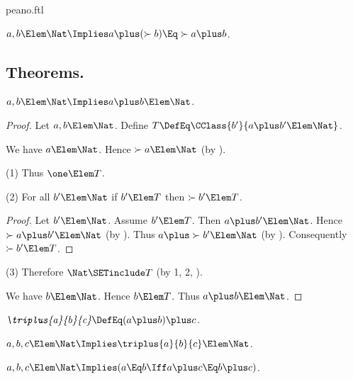 \documentclass{stex}
\begin{document}
\begin{smodule}{peano.ftl}
\begin{forthel}
  \begin{axiom*}[title=18,name=P18]
    $a,b \Elem \Nat \Implies a \plus (\succ{b}) \Eq \succ{a \plus b}$.
  \end{axiom*}
\end{forthel}


\subsection{Theorems.}


\begin{forthel}
  \begin{theorem*}[title=19,name=P19]
    $a,b \Elem \Nat \Implies a \plus b \Elem \Nat$.
  \end{theorem*}
  \begin{proof}
    Let $a,b \Elem \Nat$.
    Define $T \DefEq \CClass{b'}{a \plus b' \Elem \Nat}$.
    
    We have $a \Elem \Nat$.
    Hence $\succ{a} \Elem \Nat$ (by ).
    
    (1) Thus $\one \Elem T$.

    (2) For all $b' \Elem \Nat$ if $b' \Elem T$ then $\succ{b'} \Elem T$.
    \begin{proof}
      Let $b' \Elem \Nat$.
      Assume $b' \Elem T$.
      Then $a \plus b' \Elem \Nat$.
      Hence $\succ{a \plus b'} \Elem \Nat$ (by ).
      Thus $a \plus \succ{b'} \Elem \Nat$ (by ).
      Consequently $\succ{b'} \Elem T$.
    \end{proof}

    (3) Therefore $\Nat \SETinclude T$ (by 1, 2, ).

    We have $b \Elem \Nat$.
    Hence $b \Elem T$.
    Thus $a \plus b \Elem \Nat$.
  \end{proof}

  \begin{definition*}[title=20,for=triplus]
    $\emph{\triplus{a}{b}{c}} \DefEq (a \plus b) \plus c$.
  \end{definition*}

  \begin{theorem*}[title=21,name=P21]
    $a,b,c \Elem \Nat \Implies \triplus{a}{b}{c} \Elem \Nat$.
  \end{theorem*}

  \begin{theorem*}[title=22,name=P22]
    $a,b,c \Elem \Nat \Implies (a \Eq b \Iff a \plus c \Eq b \plus c)$.
  \end{theorem*}


\end{forthel}
\end{smodule}
\end{document}
